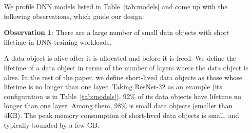 We profile DNN models listed in Table~\ref{tab:models} \textcolor{check}{and come up with the following observations, which guide our design: }

\textbf{Observation 1}: There are a large number of small data objects with short lifetime in DNN training workloads.

\textcolor{check}{
A data object is alive after it is allocated and before it is freed. We define the lifetime of a data object in terms of the number of layers where the data object is alive. In the rest of the paper, we define short-lived data objects as those whose lifetime is no longer than one layer. Taking ResNet-32 as an example (its  configuration is in Table~\ref{tab:models}), 92\% of its data objects have lifetime no longer than one layer. Among them, 98\% is small data objects (smaller than 4KB). The peak memory consumption of short-lived data objects is small, and typically bounded by a few GB.}




